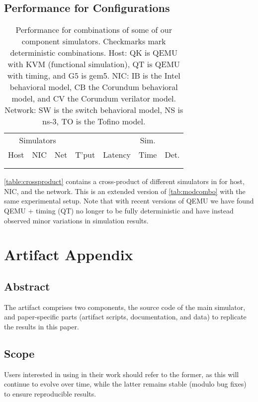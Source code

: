 \subsection{Performance for \sysname Configurations}
\label{ssec:appendix:simcombos}
\begin{table}%
\centering%
\begin{tabular}{lllrrrc}%
  \toprule
    \multicolumn{3}{c}{Simulators} & & &
    \multicolumn{1}{c}{Sim.}
    \\
    Host  & NIC & Net & T'put & Latency &
    \multicolumn{1}{c}{Time} &
    Det. \\
    \midrule
   \\
    \bottomrule\\
\end{tabular}%
\caption{Performance for combinations of some of our component
    simulators.
    Checkmarks mark deterministic combinations.
    Host: QK is QEMU with KVM (functional simulation), QT
    is QEMU with timing, and G5 is gem5.
    NIC: IB is the Intel behavioral model, CB the Corundum
    behavioral model, and CV the Corundum verilator model.
    Network: SW is the switch behavioral model, NS is ns-3, TO is the
    Tofino model.
    }%
\label{table:crossproduct}%
\end{table}

\autoref{table:crossproduct} contains a cross-product of different simulators in
\sysname for host, NIC, and the network. This is an extended version
of \autoref{tab:modcombo} with the same experimental setup.
Note that with recent versions of QEMU we have found QEMU + timing
(QT) no longer to be fully deterministic and have instead observed
minor variations in simulation results.

\clearpage

\section{Artifact Appendix}

\subsection*{Abstract}

The \sysname artifact comprises two components, the source code of the
main simulator, and paper-specific parts (artifact scripts,
documentation, and data) to replicate the results in this
paper.

\subsection*{Scope}
Users interested in using \sysname in their work should refer to the
former, as this will continue to evolve over time, while the latter
remains stable (modulo bug fixes) to ensure reproducible results.

